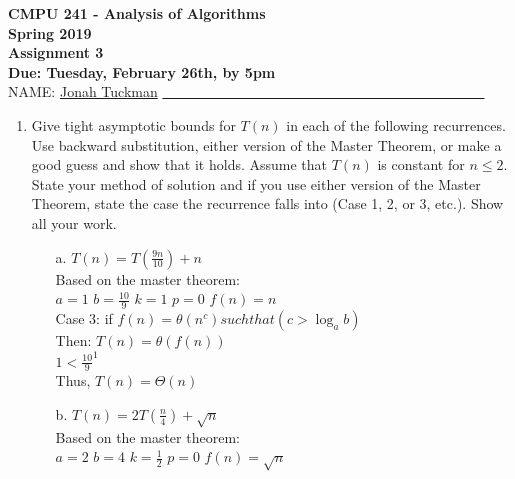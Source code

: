 \documentclass[10pt]{article}
\begin{document}
\begin{center}
{ \Large \bf CMPU 241 - Analysis of Algorithms}\\
  {\bf Spring 2019 \\
 Assignment 3\\
 Due: Tuesday, February 26th, by 5pm\\}
  \vspace{.15in}
NAME: \underline{Jonah Tuckman} \underline{\ \ \ \ \ \ \ \ \ \ \ \ \ \ \ \ \ \ \ \ \ \ \ \ \ \ \ \ \ \ \ \ \ \ \ \ \ \ \ \ \ \ \ \ \ \ }\\

\end{center}







\begin{enumerate}

\item  Give tight asymptotic bounds for $T(n)$ in each of the
following recurrences.  Use backward substitution, either version of the Master Theorem, or
make a good guess and show that it holds.
Assume that $T(n)$ is constant for $n \leq 2$.  State your method of solution and if
you use either version of the Master Theorem, state the case the recurrence falls into (Case 1, 2, or 3, etc.).
Show all your work.\\

\begin{enumerate}
\item[a.] $T(n) = T(\frac{9n}{10}) + n$\\
Based on the master theorem: \\
$a=1$
$b=\frac{10}{9}$
$k=1$
$p=0$
$f(n) = n$\\

Case 3: if $f(n) = \theta(n^{c}) such that (c > \log_a b)$ \\
Then: $T(n) = \theta(f(n))$ \\

$1 < \frac{10}{9}^{1}$ \\
Thus, $T(n) = \Theta(n)$



\vspace{.75in}

\item[b.] $T(n) = 2T(\frac{n}{4}) + \sqrt{n}$\\
Based on the master theorem: \\
$a = 2$
$b = 4$
$k = \frac{1}{2}$
$p = 0$
$f(n) = \sqrt{n}$ \\


\end{enumerate}
\end{enumerate}
\end{document}
